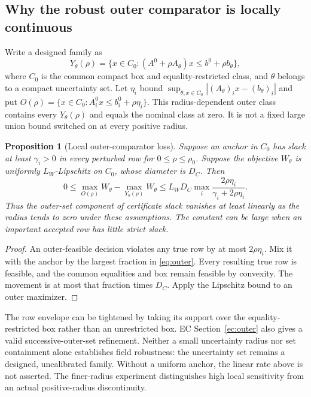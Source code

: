 \documentclass[11pt,letterpaper]{article}
\newtheorem{proposition}[theorem]{Proposition}
\theoremstyle{definition}\newtheorem{assumption}[theorem]{Assumption}
\begin{document}
\subsection{Why the robust outer comparator is locally continuous}
Write a designed family as
\[
 Y_\theta(\rho)=\{x\in C_0:(A^0+\rho A_\theta)x\leq b^0+\rho b_\theta\},
\]
where $C_0$ is the common compact box and equality-restricted class, and $\theta$ belongs to a compact uncertainty set. Let $\eta_i$ bound
$\sup_{\theta,x\in C_0}|(A_\theta)_i x-(b_\theta)_i|$ and put
$O(\rho)=\{x\in C_0:A_i^0x\leq b_i^0+\rho\eta_i\}$.
This radius-dependent outer class contains every $Y_\theta(\rho)$ and equals the nominal class at zero. It is not a fixed large union bound switched on at every positive radius.
\begin{proposition}[Local outer-comparator loss]\label{prop:outer}
Suppose an anchor in $C_0$ has slack at least $\gamma_i>0$ in every perturbed row for $0\leq\rho\leq\rho_0$. Suppose the objective $W_\theta$ is uniformly $L_W$-Lipschitz on $C_0$, whose diameter is $D_C$. Then
\begin{equation}\label{eq:outer}
 0\leq\max_{O(\rho)}W_\theta-\max_{Y_\theta(\rho)}W_\theta
 \leq L_WD_C\max_i\frac{2\rho\eta_i}{\gamma_i+2\rho\eta_i}.
\end{equation}
Thus the outer-set component of certificate slack vanishes at least linearly as the radius tends to zero under these assumptions. The constant can be large when an important accepted row has little strict slack.
\end{proposition}
\begin{proof}
An outer-feasible decision violates any true row by at most $2\rho\eta_i$. Mix it with the anchor by the largest fraction in \eqref{eq:outer}. Every resulting true row is feasible, and the common equalities and box remain feasible by convexity. The movement is at most that fraction times $D_C$. Apply the Lipschitz bound to an outer maximizer.\end{proof}

The row envelope can be tightened by taking its support over the equality-restricted box rather than an unrestricted box. EC Section~\ref{ec:outer} also gives a valid successive-outer-set refinement. Neither a small uncertainty radius nor set containment alone establishes field robustness: the uncertainty set remains a designed, uncalibrated family. Without a uniform anchor, the linear rate above is not asserted. The finer-radius experiment distinguishes high local sensitivity from an actual positive-radius discontinuity.






\end{document}
